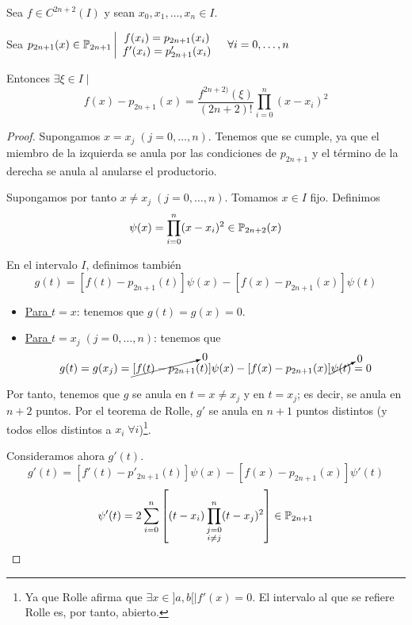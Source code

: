 \begin{teo}
    Sea $f\in C^{2n+2}(I)$ y sean $x_0,x_1,\dots,x_n\in I$.
    
    Sea $p_{2n+1}(x)\in \mathbb{P}_{2n+1} \left|\begin{array}{c}
        f(x_i) = p_{2n+1}(x_i) \\
        f'(x_i) = p_{2n+1}'(x_i) 
    \end{array} \quad \forall i=0,\dots,n \right.$
    
    Entonces $\exists \xi \in I \mid$
    \begin{equation*}
        f(x)-p_{2n+1}(x) = \frac{f^{2n+2)}(\xi)}{(2n+2)!}\prod_{i=0}^n (x-x_i)^2
    \end{equation*}
\end{teo}
\begin{proof}
    Supongamos $x=x_j\;(j=0,\dots,n)$. Tenemos que se cumple, ya que el miembro de la izquierda se anula por las condiciones de $p_{2n+1}$ y el término de la derecha se anula al anularse el productorio.

    Supongamos por tanto $x\neq x_j\;(j=0,\dots,n)$. Tomamos $x\in I$ fijo. Definimos $$\psi (x) = \prod_{i=0}^n (x-x_i)^2 \in \mathbb{P}_{2n+2}(x)$$

    En el intervalo $I$, definimos también
    \begin{equation*}
        g(t) = [f(t)-p_{2n+1}(t)]\psi(x) - [f(x)-p_{2n+1}(x)]\psi(t)
    \end{equation*}
    \begin{itemize}
        \item \underline{Para $t=x$}: tenemos que $g(t)=g(x)=0$.
        
        \item \underline{Para $t=x_j\;(j=0,\dots,n)$}: tenemos que $$g(t)=g(x_j)=\cancelto{0}{[f(t)-p_{2n+1}}(t)]\psi(x) - [f(x)-p_{2n+1}(x)]\cancelto{0}{\psi(t)} = 0$$
    \end{itemize}

    Por tanto, tenemos que $g$ se anula en $t=x\neq x_j$ y en $t=x_j$; es decir, se anula en $n+2$ puntos. Por el teorema de Rolle, $g'$ se anula en $n+1$ puntos distintos (y todos ellos distintos a $x_i\;\forall i$)\footnote{Ya que Rolle afirma que $\exists x\in ]a,b[ \mid f'(x)=0$. El intervalo al que se refiere Rolle es, por tanto, abierto.}.

    Consideramos ahora $g'(t)$.
    \begin{equation*}
        g'(t) = [f'(t)-p'_{2n+1}(t)]\psi(x) - [f(x)-p_{2n+1}(x)]\psi'(t)
    \end{equation*}
    $$\psi' (t) = 2\sum_{i=0}^n\left[ (t-x_i)\prod_{\substack{j=0\\i\neq j}}^n (t-x_j)^2\right] \in \mathbb{P}_{2n+1}$$
    

\end{proof}

